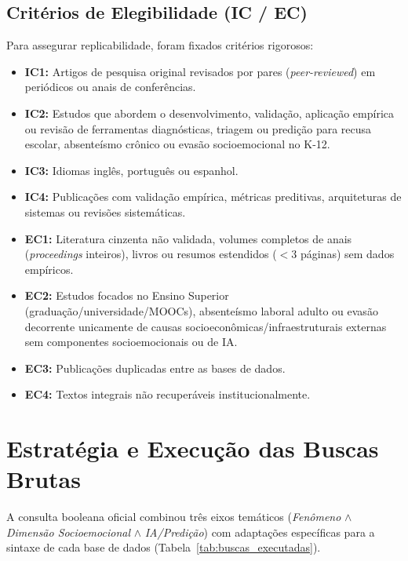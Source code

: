 \documentclass[journal,10pt,a4paper]{IEEEtran}
\begin{document}
\subsection{Critérios de Elegibilidade (IC / EC)}
Para assegurar replicabilidade, foram fixados critérios rigorosos:
\begin{itemize}
    \item \textbf{IC1:} Artigos de pesquisa original revisados por pares (\textit{peer-reviewed}) em periódicos ou anais de conferências.
    \item \textbf{IC2:} Estudos que abordem o desenvolvimento, validação, aplicação empírica ou revisão de ferramentas diagnósticas, triagem ou predição para recusa escolar, absenteísmo crônico ou evasão socioemocional no K-12.
    \item \textbf{IC3:} Idiomas inglês, português ou espanhol.
    \item \textbf{IC4:} Publicações com validação empírica, métricas preditivas, arquiteturas de sistemas ou revisões sistemáticas.
    \item \textbf{EC1:} Literatura cinzenta não validada, volumes completos de anais (\textit{proceedings} inteiros), livros ou resumos estendidos ($<3$ páginas) sem dados empíricos.
    \item \textbf{EC2:} Estudos focados no Ensino Superior (graduação/universidade/MOOCs), absenteísmo laboral adulto ou evasão decorrente unicamente de causas socioeconômicas/infraestruturais externas sem componentes socioemocionais ou de IA.
    \item \textbf{EC3:} Publicações duplicadas entre as bases de dados.
    \item \textbf{EC4:} Textos integrais não recuperáveis institucionalmente.
\end{itemize}

\section{Estratégia e Execução das Buscas Brutas}

A consulta booleana oficial combinou três eixos temáticos (\textit{Fenômeno} $\land$ \textit{Dimensão Socioemocional} $\land$ \textit{IA/Predição}) com adaptações específicas para a sintaxe de cada base de dados (Tabela~\ref{tab:buscas_executadas}).
\end{document}
